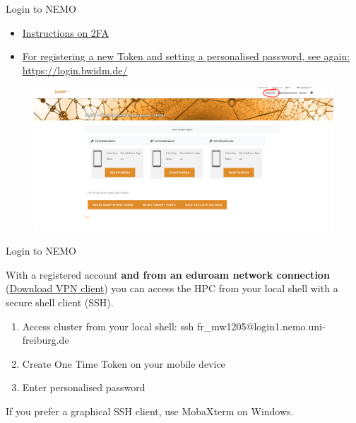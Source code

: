 \documentclass{beamer}
\begin{document}
\begin{frame}{Login to NEMO}

\begin{itemize}

\item \href{https://wiki.bwhpc.de/e/Registration/2FA}{Instructions on 2FA} 

\item \href{https://login.bwidm.de/}{For registering a new Token and setting a personalised password, see again: https://login.bwidm.de/}

\end{itemize}

\begin{figure}
    \centering
    \includegraphics[width=0.95\linewidth]{figures/BWIDM.png}
\end{figure}

\end{frame}

\begin{frame}{Login to NEMO}

With a registered account \textbf{and from an eduroam network connection} (\href{https://www.rz.uni-freiburg.de/en/services/netztel-en/vpn-1?set_language=en}{Download VPN client}) you can access the HPC from your local shell with a secure shell client (SSH).

\begin{enumerate}
    \item Access cluster from your local shell: ssh fr\_mw1205@login1.nemo.uni-freiburg.de
    \item Create One Time Token on your mobile device
    \item Enter personalised password
\end{enumerate}
\vspace{0.6cm}
\scalebox{0.6}{

}
\vspace{0.4cm}

If you prefer a graphical SSH client, use MobaXterm on Windows.

\end{frame}
\end{document}
